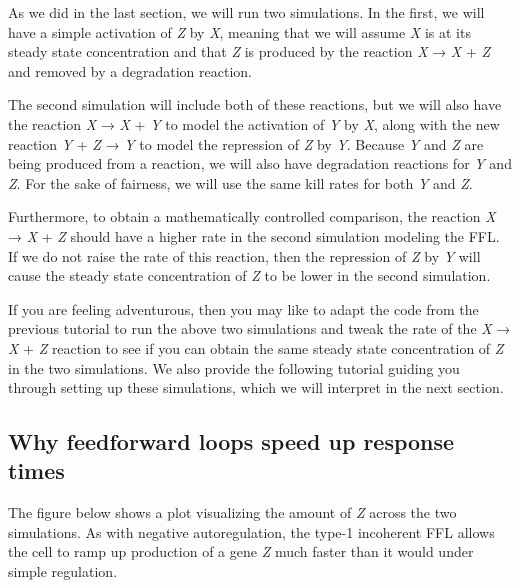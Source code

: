 As we did in the last section, we will run two simulations. In the first, we will have a simple activation of \textit{Z} by \textit{X}, meaning that we will assume \textit{X} is at its steady state concentration and that \textit{Z} is produced by the reaction \textit{X} → \textit{X} + \textit{Z} and removed by a degradation reaction.

The second simulation will include both of these reactions, but we will also have the reaction \textit{X} → \textit{X} + \textit{Y} to model the activation of \textit{Y} by \textit{X}, along with the new reaction \textit{Y} + \textit{Z} → \textit{Y} to model the repression of \textit{Z} by \textit{Y}. Because \textit{Y} and \textit{Z} are being produced from a reaction, we will also have degradation reactions for \textit{Y} and \textit{Z}. For the sake of fairness, we will use the same kill rates for both \textit{Y} and \textit{Z}.

Furthermore, to obtain a mathematically controlled comparison, the reaction \textit{X} → \textit{X} + \textit{Z} should have a higher rate in the second simulation modeling the FFL. If we do not raise the rate of this reaction, then the repression of \textit{Z} by \textit{Y} will cause the steady state concentration of \textit{Z} to be lower in the second simulation.

If you are feeling adventurous, then you may like to adapt the code from the previous tutorial to run the above two simulations and tweak the rate of the \textit{X} → \textit{X} + \textit{Z} reaction to see if you can obtain the same steady state concentration of \textit{Z} in the two simulations. We also provide the following tutorial guiding you through setting up these simulations, which we will interpret in the next section.


\FloatBarrier
{}
\subsection{Why feedforward loops speed up response times}

The figure below shows a plot visualizing the amount of \textit{Z} across the two simulations. As with negative autoregulation, the type-1 incoherent FFL allows the cell to ramp up production of a gene \textit{Z} much faster than it would under simple regulation.

